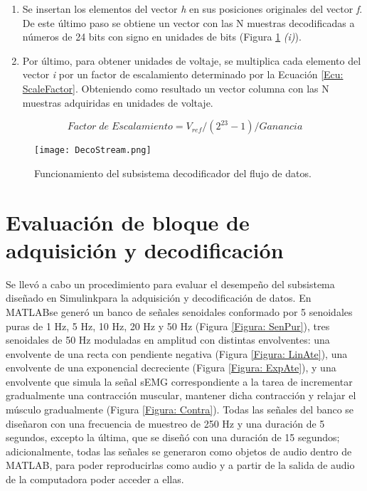 \begin{enumerate}
	\item Se insertan los elementos del vector \emph{h} en sus posiciones originales del vector \emph{f}. De este último paso se obtiene un vector con las N muestras decodificadas a números de 24 bits con signo en unidades de bits (Figura \ref{Figura: DecoStream} \emph{(i)}).
	
	\item Por último, para  obtener unidades de voltaje, se multiplica cada elemento del vector \emph{i} por un factor de escalamiento determinado por la Ecuación \ref{Ecu: ScaleFactor}. Obteniendo como resultado un vector columna con las N muestras adquiridas en unidades de voltaje.
\end{enumerate}

\begin{equation}
	Factor\; de\; Escalamiento = V_{ref}/(2^{23}-1)/Ganancia
	\label{Ecu: ScaleFactor}
\end{equation}

\begin{figure}[htbb]
\centering
	\texttt{[image: DecoStream.png]}
	\caption{Funcionamiento del subsistema decodificador del flujo de datos.}
	\label{Figura: DecoStream}
\end{figure}


\newpage
\section{Evaluación de bloque de adquisición y decodificación}\label{Sec: EvalAdquisicion}
Se llevó a cabo un procedimiento para evaluar el desempeño del subsistema diseñado en Simulink\textregistered para la adquisición y decodificación de datos. En MATLAB\textregistered se generó un banco de señales senoidales conformado por 5 senoidales puras de 1 Hz, 5 Hz, 10 Hz, 20 Hz y 50 Hz (Figura \ref{Figura: SenPur}), tres senoidales de 50 Hz moduladas en amplitud con distintas envolventes: 
una envolvente de una recta con pendiente negativa (Figura \ref{Figura: LinAte}), una envolvente de una exponencial decreciente (Figura \ref{Figura: ExpAte}), y una envolvente que simula la señal sEMG correspondiente a la tarea de incrementar gradualmente una contracción muscular, mantener dicha contracción y relajar el músculo gradualmente (Figura \ref{Figura: Contra}). Todas las señales del banco se diseñaron con una frecuencia de muestreo de 250 Hz y una duración de 5 segundos, excepto la última, que se diseñó con una duración de 15 segundos; adicionalmente, todas las señales se generaron como objetos de audio dentro de MATLAB\textregistered, para poder reproducirlas como audio y a partir de la salida de audio de la computadora poder acceder a ellas.

